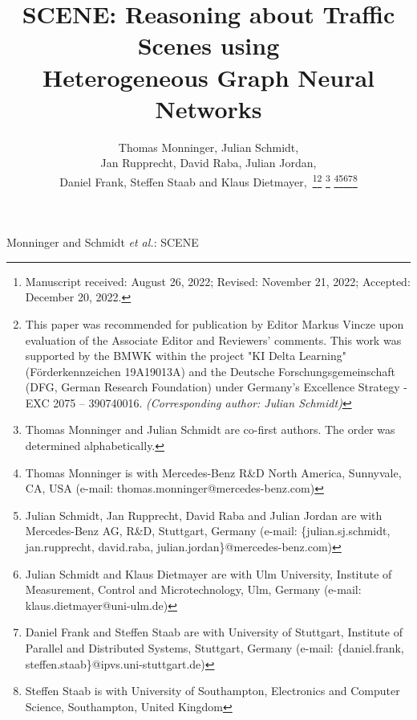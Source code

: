 \documentclass[letterpaper, 10 pt, journal, twoside]{IEEEtran}
\begin{document}
\title{SCENE: Reasoning about Traffic Scenes using\\Heterogeneous Graph Neural Networks}

\author{Thomas Monninger, Julian Schmidt,\\Jan Rupprecht, David Raba, Julian Jordan,\\Daniel Frank, Steffen Staab and Klaus Dietmayer,~\thanks{Manuscript received: August 26, 2022; Revised: November 21, 2022; Accepted: December 20, 2022.}\thanks{This paper was recommended for publication by Editor Markus Vincze upon evaluation of the Associate Editor and Reviewers' comments.
This work was supported by the BMWK within the project "KI Delta Learning" (F\"orderkennzeichen 19A19013A) and the Deutsche Forschungsgemeinschaft (DFG, German Research Foundation) under Germany's Excellence Strategy - EXC 2075 – 390740016. \textit{(Corresponding author: Julian Schmidt)}} \thanks{Thomas Monninger and Julian Schmidt are co-first authors. The order was determined alphabetically.}
\thanks{Thomas Monninger is with Mercedes-Benz R\&D North America, Sunnyvale, CA, USA (e-mail: thomas.monninger@mercedes-benz.com)}\thanks{Julian Schmidt, Jan Rupprecht, David Raba and Julian Jordan are with Mercedes-Benz AG, R\&D, Stuttgart, Germany (e-mail: \{julian.sj.schmidt, jan.rupprecht, david.raba, julian.jordan\}@mercedes-benz.com)}\thanks{Julian Schmidt and Klaus Dietmayer are with Ulm University, Institute of Measurement, Control and Microtechnology, Ulm, Germany (e-mail: klaus.dietmayer@uni-ulm.de)}\thanks{Daniel Frank and Steffen Staab are with University of Stuttgart, Institute of Parallel and Distributed Systems, Stuttgart, Germany (e-mail: \{daniel.frank, steffen.staab\}@ipvs.uni-stuttgart.de)}\thanks{Steffen Staab is with University of Southampton, Electronics and Computer Science, Southampton, United Kingdom}}

{Monninger and Schmidt \MakeLowercase{\textit{et al.}}: SCENE} 

\maketitle
\end{document}
